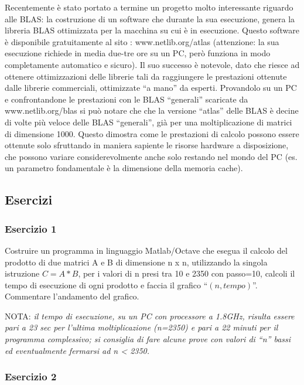 Recentemente è stato portato a termine un progetto molto interessante riguardo alle BLAS: la costruzione di un software che durante la sua esecuzione, genera la libreria BLAS ottimizzata per la macchina su cui è in esecuzione.
Questo software è disponibile gratuitamente al sito :   www.netlib.org/atlas    (attenzione: la sua esecuzione richiede in media due-tre ore su un PC, però funziona in modo completamente automatico e sicuro).
Il suo successo è notevole, dato che riesce ad ottenere ottimizzazioni delle librerie tali da raggiungere le prestazioni ottenute dalle librerie commerciali, ottimizzate ``a mano'' da esperti.
Provandolo su un PC e confrontandone le prestazioni con le BLAS ``generali'' scaricate da www.netlib.org/blas si può notare che che la versione ``atlas'' delle BLAS è decine di volte più veloce delle BLAS ``generali'', già per una moltiplicazione di matrici di dimensione 1000.
Questo dimostra come le prestazioni di calcolo possono essere ottenute solo sfruttando in maniera sapiente le risorse hardware a disposizione, che possono variare considerevolmente anche solo restando nel mondo del PC (es. un parametro fondamentale è la dimensione della memoria cache).

\subsection{Esercizi}

\subsubsection{Esercizio 1}

 Costruire un programma in linguaggio Matlab/Octave che esegua il calcolo del prodotto di due  matrici A e B di dimensione n x n, utilizzando la singola istruzione $C = A*B$, per i valori di n presi tra 10 e 2350 con passo=10,  calcoli il tempo di esecuzione di ogni prodotto e faccia il grafico ``$(n, tempo)$''. Commentare l'andamento del grafico.

NOTA: \textit{il tempo di esecuzione, su un PC con processore a 1.8GHz, risulta essere pari a 23 sec per l'ultima moltiplicazione (n=2350) e pari a 22 minuti per il programma complessivo; si consiglia di fare alcune prove con valori di ``n'' bassi ed eventualmente fermarsi ad n < 2350.}



\subsubsection{Esercizio 2}

